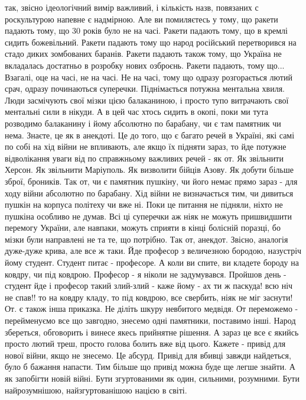 
так, звісно ідеологічний вимір важливий, і кількість назв, повязаних с
роскультурою напевне є надмірною. Але ви помиляєтесь у тому, що ракети падають
тому, що 30 років було не на часі.  Ракети падають тому, що в кремлі сидить
божевільний. Ракети падають тому що народ російський перетворився на стадо
диких зомбованих баранів. Ракети падають також тому, що Україна не вкладалась
достатньо в розробку нових озброєнь. Ракети падають, тому що... Взагалі, оце на
часі, не на часі. Не на часі, тому що одразу розгорається лютий срач, одразу
починаються суперечки. Піднімається потужна ментальна хвиля. Люди засмічують
свої мізки цією балаканиною, і просто тупо витрачають свої ментальні сили в
нікуди. А в цей час хтось сидить в окопі, поки ми тута розводимо балаканину і
йому абсолютно по барабану, чи є там памятник чи нема. Знаєте, це як в
анекдоті. Це до того, що є багато речей в Україні, які самі по собі на хід
війни не впливають, але якщо їх підняти зараз, то йде потужне відволікання
уваги від по справжньому важливих речей - як от. Як звільнити Херсон. Як
звільнити Маріуполь. Як визволити бійців Азову. Як добути більше зброї,
броників. Так от, чи є памятник пушкіну, чи його немає прямо зараз - для ходу
війни абсолютно по барабану. Хід війни не визначається тим, чи дивиться пушкін
на корпуса політеху чи вже ні. Поки це питання не підняли, ніхто не пушкіна
особливо не думав. Всі ці суперечки аж ніяк не можуть пришвидшити перемогу
України, але навпаки, можуть сприяти в кінці болісній поразці, бо мізки були
направлені не та те, що потрібно. Так от, анекдот. Звісно, аналогія дуже-дуже
крива, але все ж таки. Йде професор з величезною бородою, назустріч йому
студент. Студент питає - професоре. А коли ви спите, ви кладете бороду на
ковдру, чи під ковдрою. Професор - я ніколи не задумувався. Пройшов день -
студент йде і професор такий злий-злий - каже йому - ах ти ж паскуда! всю ніч
не спав!! то на ковдру кладу, то під ковдрою, все свербить, ніяк не міг
заснути! От. є також інша приказка. Не діліть шкуру невбитого медвідя. От
переможемо - перейменуємо все що завгодно, знесемо одні памятники, поставимо
інші. Народ збереться, обговорить і винесе якесь прийнятне рішення. А зараз це
все є якийсь просто лютий треш, просто голова болить вже від цього. Кажете -
привід для нової війни, якщо не знесемо. Це абсурд. Привід для вбивці завжди
найдеться, було б бажання напасти. Тим більше що привід можна буде ще легше
знайти. А як запобігти новій війні. Бути згуртованими як один, сильними,
розумними. Бути найрозумнішою, найзгуртованішою нацією в світі.

